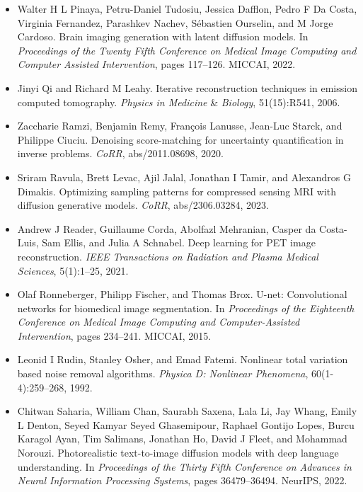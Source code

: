 \documentclass{article}
\begin{document}
\begin{itemize}
\item 
Walter H L Pinaya, Petru-Daniel Tudosiu, Jessica Dafflon, Pedro F Da Costa, Virginia Fernandez, Parashkev Nachev, Sébastien Ourselin, and M Jorge Cardoso. Brain imaging generation with latent diffusion models. In \textit{Proceedings of the Twenty Fifth Conference on Medical Image Computing and Computer Assisted Intervention}, pages 117–126. MICCAI, 2022.

\item 
Jinyi Qi and Richard M Leahy. Iterative reconstruction techniques in emission computed tomography. \textit{Physics in Medicine} \& \textit{Biology}, 51(15):R541, 2006.

\item 
Zaccharie Ramzi, Benjamin Remy, François Lanusse, Jean-Luc Starck, and Philippe Ciuciu. Denoising score-matching for uncertainty quantification in inverse problems. \textit{CoRR}, abs/2011.08698, 2020.

\item 
Sriram Ravula, Brett Levac, Ajil Jalal, Jonathan I Tamir, and Alexandros G Dimakis. Optimizing sampling patterns for compressed sensing MRI with diffusion generative models. \textit{CoRR}, abs/2306.03284, 2023.

\item 
Andrew J Reader, Guillaume Corda, Abolfazl Mehranian, Casper da Costa-Luis, Sam Ellis, and Julia A Schnabel. Deep learning for PET image reconstruction. \textit{IEEE Transactions on Radiation and Plasma Medical Sciences}, 5(1):1–25, 2021.

\item 
Olaf Ronneberger, Philipp Fischer, and Thomas Brox. U-net: Convolutional networks for biomedical image segmentation. In \textit{Proceedings of the Eighteenth Conference on Medical Image Computing and Computer-Assisted Intervention}, pages 234–241. MICCAI, 2015.

\item 
Leonid I Rudin, Stanley Osher, and Emad Fatemi. Nonlinear total variation based noise removal algorithms. \textit{Physica D: Nonlinear Phenomena}, 60(1-4):259–268, 1992.

\item 
Chitwan Saharia, William Chan, Saurabh Saxena, Lala Li, Jay Whang, Emily L Denton, Seyed Kamyar Seyed Ghasemipour, Raphael Gontijo Lopes, Burcu Karagol Ayan, Tim Salimans, Jonathan Ho, David J Fleet, and Mohammad Norouzi. Photorealistic text-to-image diffusion models with deep language understanding. In \textit{Proceedings of the Thirty Fifth Conference on Advances in Neural Information Processing Systems}, pages 36479–36494. NeurIPS, 2022.


\end{itemize}
\end{document}
